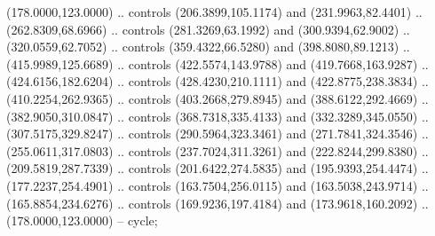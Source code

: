 \begin{scope}[draw=black,fill=black!20,line join=round,line width=0.208pt]
     (178.0000,123.0000) .. controls (206.3899,105.1174) and
      (231.9963,82.4401) .. (262.8309,68.6966) .. controls (281.3269,63.1992) and
      (300.9394,62.9002) .. (320.0559,62.7052) .. controls (359.4322,66.5280) and
      (398.8080,89.1213) .. (415.9989,125.6689) .. controls (422.5574,143.9788) and
      (419.7668,163.9287) .. (424.6156,182.6204) .. controls (428.4230,210.1111) and
      (422.8775,238.3834) .. (410.2254,262.9365) .. controls (403.2668,279.8945) and
      (388.6122,292.4669) .. (382.9050,310.0847) .. controls (368.7318,335.4133) and
      (332.3289,345.0550) .. (307.5175,329.8247) .. controls (290.5964,323.3461) and
      (271.7841,324.3546) .. (255.0611,317.0803) .. controls (237.7024,311.3261) and
      (222.8244,299.8380) .. (209.5819,287.7339) .. controls (201.6422,274.5835) and
      (195.9393,254.4474) .. (177.2237,254.4901) .. controls (163.7504,256.0115) and
      (163.5038,243.9714) .. (165.8854,234.6276) .. controls (169.9236,197.4184) and
      (173.9618,160.2092) .. (178.0000,123.0000) -- cycle;
\end{scope}
